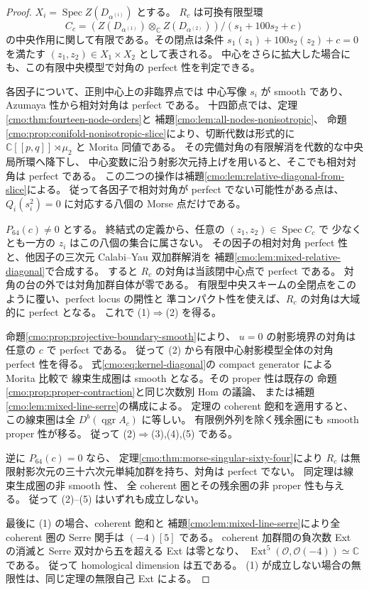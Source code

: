 \begin{proof}
$X_i=\operatorname{Spec}Z(D_{\alpha^{(i)}})$ とする。
$R_c$ は可換有限型環
\[
 C_c=(Z(D_{\alpha^{(1)}})\otimes_{\mathbb C}Z(D_{\alpha^{(2)}}))
          /(s_1+100s_2+c)
\]
の中央作用に関して有限である。その閉点は条件 $s_1(z_1)+100s_2(z_2)+c=0$ を満たす
$(z_1,z_2)\in X_1\times X_2$ として表される。
中心をさらに拡大した場合にも、この有限中央模型で対角の perfect 性を判定できる。

各因子について、正則中心上の非臨界点では
中心写像 $s_i$ が smooth であり、Azumaya 性から相対対角は perfect である。
十四節点では、定理\ref{cmo:thm:fourteen-node-orders}と
補題\ref{cmo:lem:all-nodes-nonisotropic}、
命題\ref{cmo:prop:conifold-nonisotropic-slice}により、切断代数は形式的に
$\mathbb C[[p,q]]\rtimes\mu_2$ と Morita 同値である。
その完備対角の有限解消を代数的な中央局所環へ降下し、
中心変数に沿う射影次元持上げを用いると、そこでも相対対角は perfect である。
この二つの操作は補題\ref{cmo:lem:relative-diagonal-from-slice}による。
従って各因子で相対対角が perfect でない可能性がある点は、
$Q_i(s_i^2)=0$ に対応する八個の Morse 点だけである。

$P_{64}(c)\ne0$ とする。
終結式の定義から、任意の $(z_1,z_2)\in\operatorname{Spec}C_c$ で
少なくとも一方の $z_i$ はこの八個の集合に属さない。
その因子の相対対角 perfect 性と、他因子の三次元 Calabi--Yau 双加群解消を
補題\ref{cmo:lem:mixed-relative-diagonal}で合成する。
すると $R_c$ の対角は当該閉中心点で perfect である。
対角の台の外では対角加群自体が零である。
有限型中央スキームの全閉点をこのように覆い、perfect locus の開性と
準コンパクト性を使えば、$R_c$ の対角は大域的に perfect となる。
これで (1)$\Rightarrow$(2) を得る。

命題\ref{cmo:prop:projective-boundary-smooth}により、
$u=0$ の射影境界の対角は任意の $c$ で perfect である。
従って (2) から有限中心射影模型全体の対角 perfect 性を得る。
式\eqref{cmo:eq:kernel-diagonal}の compact generator による Morita 比較で
線束生成圏は smooth となる。その proper 性は既存の
命題\ref{cmo:prop:proper-contraction}と同じ次数別 Hom の議論、
または補題\ref{cmo:lem:mixed-line-serre}の構成による。
定理の coherent 飽和を適用すると、
この線束圏は全 $D^b(\operatorname{qgr}A_c)$ に等しい。
有限例外列を除く残余圏にも smooth proper 性が移る。
従って (2)$\Rightarrow$(3),(4),(5) である。

逆に $P_{64}(c)=0$ なら、
定理\ref{cmo:thm:morse-singular-sixty-four}により
$R_c$ は無限射影次元の三十六次元単純加群を持ち、対角は perfect でない。
同定理は線束生成圏の非 smooth 性、
全 coherent 圏とその残余圏の非 proper 性も与える。
従って (2)--(5) はいずれも成立しない。

最後に (1) の場合、coherent 飽和と
補題\ref{cmo:lem:mixed-line-serre}により全 coherent 圏の Serre 関手は
$(-4)[5]$ である。
coherent 加群間の負次数 Ext の消滅と Serre 双対から五を超える Ext は零となり、
$\operatorname{Ext}^5(\mathcal O,\mathcal O(-4))\simeq\mathbb C$ である。
従って homological dimension は五である。
(1) が成立しない場合の無限性は、同じ定理の無限自己 Ext による。
\end{proof}

